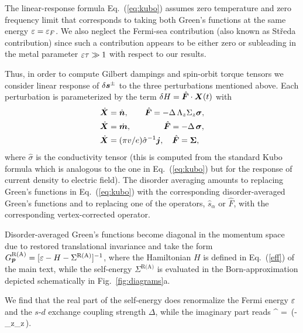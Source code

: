 The linear-response formula Eq.~(\ref{eq:kubo}) assumes zero temperature and zero frequency limit that corresponds to taking both Green's functions at the same energy $\varepsilon=\varepsilon_F$. We also neglect the Fermi-sea contribution (also known as St\v{r}eda contribution) since such a contribution appears to be either zero or subleading in the metal parameter $\varepsilon\tau\gg 1$ with respect to our results.  
 
Thus, in order to compute Gilbert dampings and spin-orbit torque tensors we consider linear response of $\delta\boldsymbol{s}^\pm$ to the three perturbations mentioned above. Each perturbation is parameterized by the term $\delta H=\hat{\boldsymbol{F}}\cdot \boldsymbol{X}(t)$ with
\beml
\label{eq:ops}
\begin{align}
&\dot{\boldsymbol{X}}=\dot{\boldsymbol{n}},\qquad \hat{\boldsymbol{F}}=-\Delta\,\Lambda_z\Sigma_z\boldsymbol{\sigma},\\ 
&\dot{\boldsymbol{X}}=\dot{\boldsymbol{m}},\qquad\qquad\hat{\boldsymbol{F}}=-\Delta\, \boldsymbol{\sigma},\\
&\dot{\boldsymbol{X}}=(\pi v/e)\hat{\sigma}^{-1}\boldsymbol{j},\quad \hat{\boldsymbol{F}} =\boldsymbol{\Sigma},
\end{align}
\eml
where $\hat{\sigma}$ is the conductivity tensor (this is computed from the standard Kubo formula which is analogous to the one in Eq.~(\ref{eq:kubo}) but for the response of current density to electric field). The disorder averaging amounts to replacing Green's functions in Eq.~(\ref{eq:kubo}) with the corresponding disorder-averaged Green's functions and to replacing one of the operators, $\hat{s}_\alpha$ or $\hat{F}$, with the corresponding vertex-corrected operator.

Disorder-averaged Green's functions become diagonal in the momentum space due to restored translational invariance and take the form 
$G^\text{R(A)}_{\boldsymbol{p}} = [\varepsilon-H-\Sigma^\textrm{R(A)}]^{-1}$, where the Hamiltonian $H$ is defined in Eq.~(\ref{eff}) of the main text, while the self-energy $\Sigma^\text{R(A)}$ is evaluated in the Born-approximation depicted schematically in Fig.~\ref{fig:diagrams}a. 

We find that the real part of the self-energy does renormalize the Fermi energy $\varepsilon$ and the $s$-$d$ exchange coupling strength $\Delta$, while the imaginary part reads
\be
\im \Sigma^ = \mp{}\,(\ep-\Delta\,\Lambda_z\Sigma_z\,\cdot\bb{\sigma}).
\e

